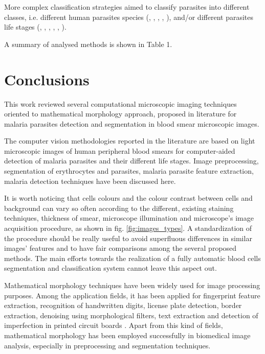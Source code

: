 \documentclass[sensors,review,submit,moreauthors,pdftex,10pt,a4paper]{mdpi}
\begin{document}
	More complex classification strategies aimed to classify parasites into different classes, i.e. different human parasites species (\cite{Ahirwar2012}, \cite{Das2013}, \cite{Das2014}, \cite{Khan2011}, \cite{Tek2010}),
	and/or different parasites life stages (\cite{Anggraini2011}, \cite{Das2013}, \cite{Das2014}, \cite{DiRuberto2002}, \cite{Diaz2009}, \cite{Tek2010}).
	
	A summary of analysed methods is shown in Table 1.
	
	
	\section{Conclusions}
	This work reviewed several computational microscopic imaging techniques oriented to mathematical morphology approach, proposed in literature for malaria parasites detection and segmentation in blood smear microscopic images.
	
	The computer vision methodologies reported in the literature are based on light microscopic images of human peripheral blood smears for computer-aided detection of malaria parasites and their different life stages.
	Image preprocessing, segmentation of erythrocytes and parasites, malaria parasite feature extraction, malaria detection techniques have been discussed here.
	
	It is worth noticing that cells colours and the colour contrast between cells and background can vary so often according to the different, existing staining techniques, thickness of smear, microscope illumination and microscope's image acquisition procedure, as shown in fig. \ref{fig:images_types}. A standardization of the procedure should be really useful to avoid superfluous differences in similar images' features and to have fair comparisons among the several proposed methods. The main efforts towards the realization of a fully automatic blood cells segmentation and classification system cannot leave this aspect out.
	
	Mathematical morphology techniques have been widely used for image processing purposes. Among the application fields, it has been applied for fingerprint feature extraction, recognition of handwritten digits, license plate detection, border extraction, denoising using morphological filters, text extraction and detection of imperfection in printed circuit boards \cite{Kaur2013}. Apart from this kind of fields, mathematical morphology has been employed successfully in biomedical image analysis, especially in preprocessing and segmentation techniques.
	
\end{document}
